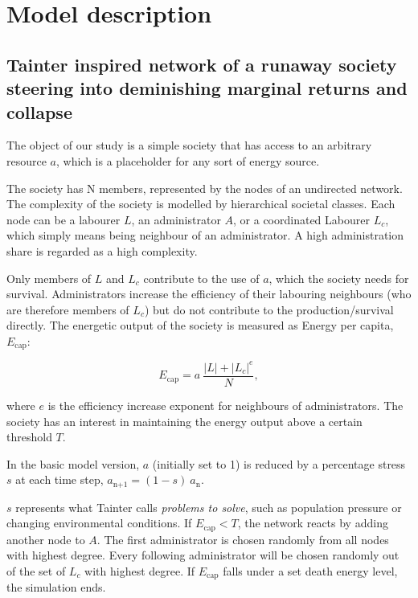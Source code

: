 \section{Model description}


\subsection{Tainter inspired network of a runaway society steering into deminishing marginal returns and collapse}
The object of our study is a simple society that has access to an arbitrary resource $a$, which is a placeholder for any sort of energy source.

The society has N members, represented by the nodes of an undirected network. The complexity of the society is modelled by hierarchical societal classes. Each node can be a labourer $L$, an administrator $A$, or a coordinated Labourer $L_c$, which simply means being neighbour of an administrator. A high administration share is regarded as a high complexity.

Only members of $L$ and $L_c$ contribute to the use of $a$, which the society needs for survival. Administrators increase the efficiency of their labouring neighbours (who are therefore members of $L_c$) but do not contribute to the production/survival directly. The energetic output of the society is measured as Energy per capita, $E_{\text{cap}}$:

\begin{equation}
    E_{\text{cap}} = a \ \frac{|L| + |L_c|^e}{N},
\end{equation}

where $e$ is the efficiency increase exponent for neighbours of administrators. The society has an interest in maintaining the energy output above a certain threshold $T$.

In the basic model version, $a$ (initially set to 1) is reduced by a percentage stress $s$ at each time step, $a_{\text{n+1}} = (1-s)\  a_{\text{n}}$.

$s$ represents what Tainter calls \textit{problems to solve}, such as population pressure or changing environmental conditions. If $E_{\text{cap}} < T$, the network reacts by adding another node to $A$. The first administrator is chosen randomly from all nodes with highest degree. Every following administrator will be chosen randomly out of the set of $L_c$ with highest degree.
If $E_{\text{cap}}$ falls under a set death energy level, the simulation ends.


